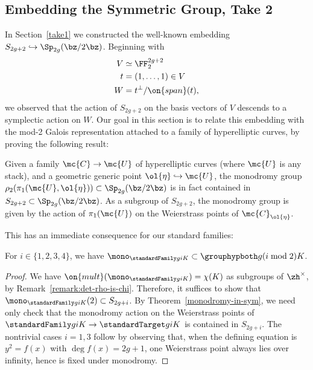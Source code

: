 \subsection{Embedding the Symmetric Group, Take 2} \label{symbed}

In Section~\ref{take1} we constructed the well-known embedding $S_{2g+2} \hookrightarrow \Sp_{2g}(\bz / 2 \bz)$. Beginning with
\begin{align*}
	V &\simeq \FF_2^{2g+2} \\
	t &= (1, \dots, 1) \in V \\
	W &= t^{\perp}/\on{span}(t),
\end{align*}
we observed that the action of $S_{2g+2}$ on the basis vectors of $V$ descends to a symplectic action on $W$. Our goal in this section is to relate this embedding with the mod-2 Galois representation attached to a family of hyperelliptic curves, by proving the following result:
\begin{theorem} \label{monodromy-in-sym}
	Given a family $\mc{C} \to \mc{U}$ of hyperelliptic curves (where $\mc{U}$ is any stack), and a geometric generic point $\ol{\eta} \hookrightarrow \mc{U}$, the monodromy group $\rho_{2}(\pi_1(\mc{U}, \ol{\eta})) \subset \Sp_{2g}(\bz / 2 \bz)$ is in fact contained in $S_{2g+2} \subset \Sp_{2g}(\bz / 2 \bz)$. As a subgroup of $S_{2g+2}$, the monodromy group is given by the action of $\pi_1(\mc{U})$ on the Weierstrass points of $\mc{C}_{\ol{\eta}}$.
\end{theorem}
This has an immediate consequence for our standard families:
\begin{corollary} \label{sym-W}
	For $i \in \{1, 2, 3, 4\}$, we have $\mono_{\standardFamily g i K} \subset \grouphypboth g {(i \bmod 2)} K$.
\end{corollary}
\begin{proof}
	We have $\on{mult}(\mono_{\standardFamily g i K}) = \chi(K)$ as subgroups of $\zh^\times$, by Remark~\ref{remark:det-rho-is-chi}. Therefore, it suffices to show that $\mono_{\standardFamily g i K}(2) \subset S_{2g+i}$. By Theorem~\ref{monodromy-in-sym}, we need only check that the monodromy action on the Weierstrass points of $\standardFamily g i K \to \standardTarget g i K$ is contained in $S_{2g+i}$. The nontrivial cases $i = 1, 3$ follow by observing that, when the defining equation is $y^2 = f(x)$ with $\deg f(x) = 2g+1$, one Weierstrass point always lies over infinity, hence is fixed under monodromy.
\end{proof}

